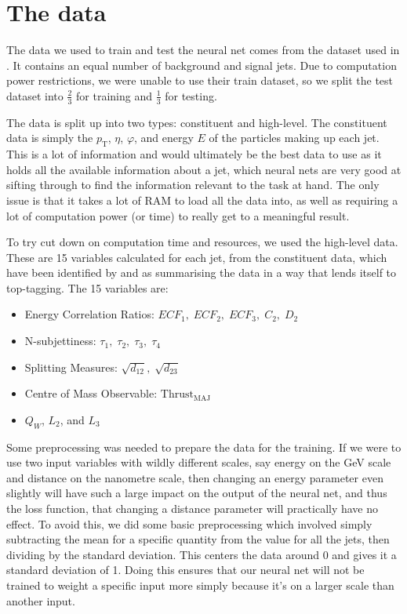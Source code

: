 \documentclass[11pt]{article}
\numberwithin{equation}{section}
\numberwithin{figure}{section}
\numberwithin{table}{section}
\begin{document}
\section{The data}\label{sec:Data}
The data we used to train and test the neural net comes from the dataset used in \cite{top-tagging-data}. It contains an equal number of background and signal jets. Due to computation power restrictions, we were unable to use their train dataset, so we split the test dataset into $\frac 23$ for training and $\frac 13$ for testing.

The data is split up into two types: constituent and high-level. The constituent data is simply the $p_\mathrm{T}$, $\eta$, $\varphi$, and energy $E$ of the particles making up each jet. This is a lot of information and would ultimately be the best data to use as it holds all the available information about a jet, which neural nets are very good at sifting through to find the information relevant to the task at hand. The only issue is that it takes a lot of RAM to load all the data into, as well as requiring a lot of computation power (or time) to really get to a meaningful result. 

To try cut down on computation time and resources, we used the high-level data. These are 15 variables calculated for each jet, from the constituent data, which have been identified by \cite{ATL-PHYS-PUB-2021-028} and \cite{ATL-PHYS-PUB-2017-004} as summarising the data in a way that lends itself to top-tagging. The 15 variables are:

\begin{itemize}
    \item Energy Correlation Ratios: $ECF_1,\; ECF_2,\; ECF_3,\; C_2,\; D_2$
    \item N-subjettiness: $\tau_1,\; \tau_2,\; \tau_3,\; \tau_4$
    \item Splitting Measures: $\sqrt{d_{12}},\; \sqrt{d_{23}}$
    \item Centre of Mass Observable: $\mathrm{Thrust}_\mathrm{MAJ}$
    \item $Q_W$, $L_2$, and $L_3$
\end{itemize}

Some preprocessing was needed to prepare the data for the training. If we were to use two input variables with wildly different scales, say energy on the \si[]{\giga\electronvolt} scale and distance on the nanometre scale, then changing an energy parameter even slightly will have such a large impact on the output of the neural net, and thus the loss function, that changing a distance parameter will practically have no effect. To avoid this, we did some basic preprocessing which involved simply subtracting the mean for a specific quantity from the value for all the jets, then dividing by the standard deviation. This centers the data around 0 and gives it a standard deviation of 1. Doing this ensures that our neural net will not be trained to weight a specific input more simply because it's on a larger scale than another input.
\end{document}
